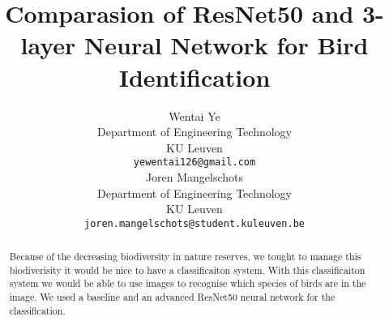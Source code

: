 \documentclass{article}
\title{Comparasion of ResNet50 and 3-layer Neural Network for Bird Identification}
\author{
  Wentai Ye\\
  Department of Engineering Technology\\
  KU Leuven\\
  \texttt{yewentai126@gmail.com} \\
  \And
  Joren Mangelschots \\
  Department of Engineering Technology\\
  KU Leuven\\
  \texttt{joren.mangelschots@student.kuleuven.be} \\
}
\begin{document}
\maketitle

\begin{abstract}
  Because of the decreasing biodiversity in nature reserves, we tought to manage this biodiverisity it would be nice to have a classificaiton system. With this classificaiton system we would be able to use images to recognise which species of birds are in the image. We used a baseline and an advanced ResNet50 neural network for the classification. 
\end{abstract}









\end{document}
